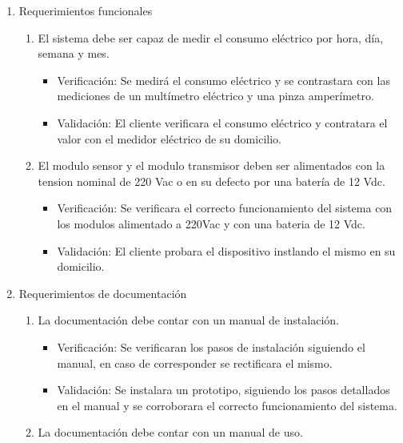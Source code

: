 \documentclass[
11pt, %
]{charter}
\begin{document}
\begin{enumerate}
	\item Requerimientos funcionales
		\begin{enumerate}

			\item El sistema debe ser capaz de medir el consumo eléctrico por hora, día, semana y mes.

			\begin{itemize}
			\item Verificación: Se medirá el consumo eléctrico y se contrastara con las mediciones de un multímetro eléctrico y una pinza amperímetro.
			\item Validación: El cliente verificara el consumo eléctrico y contratara el valor con el medidor eléctrico de su domicilio.
			\end{itemize}

	\item El modulo sensor y el modulo transmisor deben ser alimentados con la tension nominal de 220 Vac o en su defecto por una batería de 12 Vdc.
			
			\begin{itemize}
		\item Verificación: Se verificara el correcto funcionamiento del sistema con los modulos alimentado a 220Vac y con una bateria de 12 Vdc.
			\item Validación: El cliente probara el dispositivo instlando el mismo en su domicilio.
			\end{itemize}
			
		\end{enumerate}
		
	\item Requerimientos de documentación
		\begin{enumerate}

		\item La documentación debe contar con un manual de instalación.
			
		\begin{itemize}
		\item Verificación: Se verificaran los pasos de instalación siguiendo el manual, en caso de  corresponder se rectificara el mismo. 
		\item Validación: Se instalara un prototipo, siguiendo los pasos detallados en el manual y se corroborara el correcto funcionamiento del sistema.
		\end{itemize}
			
		\item La documentación debe contar con un manual de uso.
		

\end{enumerate}
\end{enumerate}
\end{document}
